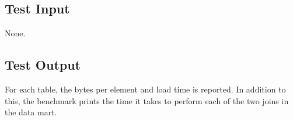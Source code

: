 \subsection{Test Input}
\label{sub:Test Input}
None.

\subsection{Test Output}
\label{sub:Test Output}
For each table, the bytes per element and load time is reported. In addition to this, the benchmark prints the time it takes to perform each of the two joins in the data mart.

%
%
%
%
%
%
%



